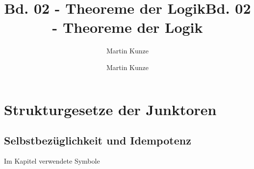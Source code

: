 \documentclass[main.tex]{subfiles}
\title{Bd. 02 - Theoreme der Logik}
\author{Martin Kunze}
\date{}
\begin{document}
\title{Bd. 02 - Theoreme der Logik}
\author{Martin Kunze}
\date{}
\hypersetup{pageanchor=false}
\maketitle
\hypersetup{pageanchor=true}
\tableofcontents
\setcounter{file}{2}
\renewcommand{\FormulaBandID}{2}


\chapter{Strukturgesetze der Junktoren}

\section{Selbstbezüglichkeit und Idempotenz}
\begin{DeltaContext}{Im Kapitel verwendete Symbole}
\end{DeltaContext}

\begin{tabproof}
\end{tabproof}

\begin{tabproof}
\end{tabproof}

\begin{tabproof}
\end{tabproof}

\begin{tabproofsplit}
  \proofpart{\(\vdash\)}
  \closeproofpart

  \proofpart{\(\dashv\)}
  \closeproofpart
\end{tabproofsplit}


\begin{tabproofsplit}
  \proofpart{\(\vdash\)}
  \closeproofpart

  \proofpart{\(\dashv\)}
  \closeproofpart
\end{tabproofsplit}
\end{document}
